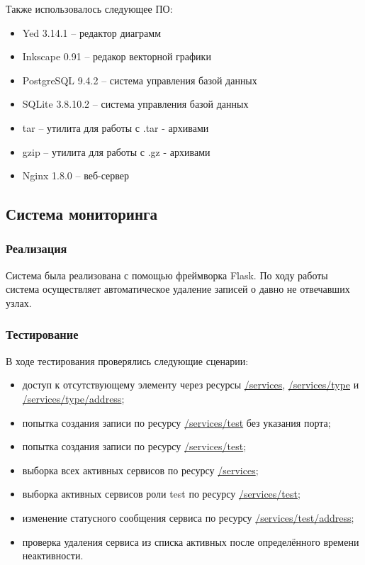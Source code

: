 \documentclass[a4paper,12pt]{report}
\numberwithin{equation}{section}
\begin{document}
  Также использовалось следующее ПО:
  \begin{itemize}
    \item Yed 3.14.1 \cite{yed} -- редактор диаграмм
    \item Inkscape 0.91 \cite{inkscape} -- редакор векторной графики
    \item PostgreSQL 9.4.2 \cite{postgresql} -- система управления базой данных
    \item SQLite 3.8.10.2 \cite{sqlite} -- система управления базой данных
    \item tar \cite{tarl, tarw} -- утилита для работы с .tar - архивами
    \item gzip \cite{gzipl, gzipw} -- утилита для работы с .gz - архивами
    \item Nginx 1.8.0 \cite{nginx} -- веб-сервер
  \end{itemize}
  
  \subsection{Система мониторинга}
  \subsubsection{Реализация}
  Система была реализована с помощью фреймворка Flask.
  По ходу работы система осуществляет автоматическое удаление записей о давно не отвечавших узлах.
  
  \subsubsection{Тестирование}
  В ходе тестирования проверялись следующие сценарии:
  
  \begin{itemize}
    \item доступ к отсутствующему элементу через ресурсы \url{/services}, \url{/services/type} и \url{/services/type/address};
    \item попытка создания записи по ресурсу \url{/services/test} без указания порта;
    \item попытка создания записи по ресурсу \url{/services/test};
    \item выборка всех активных сервисов по ресурсу \url{/services};
    \item выборка активных сервисов роли test по ресурсу \url{/services/test};
    \item изменение статусного сообщения сервиса по ресурсу \url{/services/test/address};
    \item проверка удаления сервиса из списка активных после определённого времени неактивности.
  \end{itemize}
  
\end{document}
